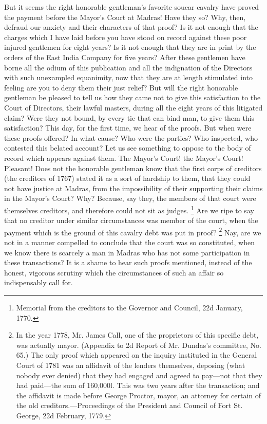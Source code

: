 But it seems the right honorable gentleman's favorite soucar cavalry have proved the payment before the Mayor's Court at Madras! Have they so? Why, then, defraud our anxiety and their characters of that proof? Is it not enough that the charges which I have laid before you have stood on record against these poor injured gentlemen for eight years? Is it not enough that they are in print by the orders of the East India Company for five years? After these gentlemen have borne all the odium of this publication and all the indignation of the Directors with such unexampled equanimity, now that they are at length stimulated into feeling are you to deny them their just relief? But will the right honorable gentleman be pleased to tell us how they came not to give this satisfaction to the Court of Directors, their lawful masters, during all the eight years of this litigated claim? Were they not bound, by every tie that can bind man, to give them this satisfaction? This day, for the first time, we hear of the proofs. But when were these proofs offered? In what cause? Who were the parties? Who inspected, who contested this belated account? Let us see something to oppose to the body of record which appears against them. The Mayor's Court! the Mayor's Court! Pleasant! Does not the honorable gentleman know that the first corps of creditors (the creditors of 1767) stated it as a sort of hardship to them, that they could not have justice at Madras, from the impossibility of their supporting their claims in the Mayor's Court? Why? Because, say they, the members of that court were themselves creditors, and therefore could not sit as judges.
\footnote{ Memorial from the creditors to the Governor and Council, 22d January, 1770.}
 Are we ripe to say that no creditor under similar circumstances was member of the court, when the payment which is the ground of this cavalry debt was put in proof?
\footnote{ In the year 1778, Mr. James Call, one of the proprietors of this specific debt, was actually mayor. (Appendix to 2d Report of Mr. Dundas's committee, No. 65.) The only proof which appeared on the inquiry instituted in the General Court of 1781 was an affidavit of the lenders themselves, deposing (what nobody ever denied) that they had engaged and agreed to pay—not that they had paid—the sum of 160,000l. This was two years after the transaction; and the affidavit is made before George Proctor, mayor, an attorney for certain of the old creditors.—Proceedings of the President and Council of Fort St. George, 22d February, 1779.}
 Nay, are we not in a manner compelled to conclude that the court was so constituted, when we know there is scarcely a man in Madras who has not some participation in these transactions? It is a shame to hear such proofs mentioned, instead of the honest, vigorous scrutiny which the circumstances of such an affair so indispensably call for.

